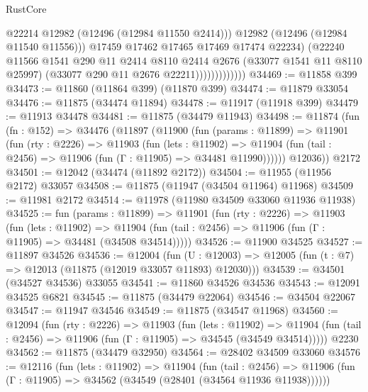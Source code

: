 \begin{lexlean}{RustCore}
\begin{coremodule}
                                @22214
                                @12982
                                (@12496 (@12984 @11550 @2414)))
                              @12982
                              (@12496 (@12984 @11540 @11556)))
                            @17459
                            @17462
                            @17465
                            @17469
                            @17474
                            @22234)
                          (@22240
                            @11566
                            @1541
                            @290
                            @11
                            @2414
                            @8110
                            @2414
                            @2676
                            (@33077 @1541 @11 @8110 @25997)
                            (@33077 @290 @11 @2676 @22211)))))))))))))
@34469 := @11858 @399
@34473 := @11860 (@11864 @399) (@11870 @399)
@34474 := @11879 @33054
@34476 := @11875 (@34474 @11894)
@34478 := @11917 (@11918 @399)
@34479 := @11913 @34478
@34481 := @11875 (@34479 @11943)
@34498 := @11874
    (fun (fn : @152) =>
    @34476
      (@11897
        (@11900
          (fun (params : @11899) =>
          @11901
            (fun (rty : @2226) =>
            @11903
              (fun (lets : @11902) =>
              @11904 (fun (tail : @2456) => @11906 (fun (Γ : @11905) => @34481 @11990))))))
        @12036))
    @2172
@34501 := @12042 (@34474 (@11892 @2172))
@34504 := @11955 (@11956 @2172) @33057
@34508 := @11875 (@11947 (@34504 @11964) @11968)
@34509 := @11981 @2172
@34514 := @11978 (@11980 @34509 @33060 @11936 @11938)
@34525 := fun (params : @11899) =>
  @11901
    (fun (rty : @2226) =>
    @11903
      (fun (lets : @11902) =>
      @11904 (fun (tail : @2456) => @11906 (fun (Γ : @11905) => @34481 (@34508 @34514)))))
@34526 := @11900 @34525
@34527 := @11897 @34526
@34536 := @12004
    (fun (U : @12003) => @12005 (fun (t : @7) => @12013 (@11875 (@12019 @33057 @11893) @12030)))
@34539 := @34501 (@34527 @34536) @33055
@34541 := @11860 @34526 @34536
@34543 := @12091 @34525 @6821
@34545 := @11875 (@34479 @22064)
@34546 := @34504 @22067
@34547 := @11947 @34546
@34549 := @11875 (@34547 @11968)
@34560 := @12094
    (fun (rty : @2226) =>
    @11903
      (fun (lets : @11902) =>
      @11904 (fun (tail : @2456) => @11906 (fun (Γ : @11905) => @34545 (@34549 @34514)))))
    @2230
@34562 := @11875 (@34479 @32950)
@34564 := @28402 @34509 @33060
@34576 := @12116
    (fun (lets : @11902) =>
    @11904
      (fun (tail : @2456) =>
      @11906 (fun (Γ : @11905) => @34562 (@34549 (@28401 (@34564 @11936 @11938))))))

\end{coremodule}
\end{lexlean}
